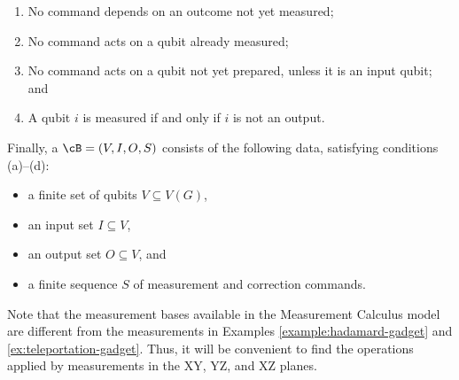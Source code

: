 \begin{definition}
\begin{enumerate}[label=(\alph*)]
    \item No command depends on an outcome not yet measured;
    \item No command acts on a qubit already measured;
    \item No command acts on a qubit not yet prepared, unless it is an input qubit; and
    \item A qubit $i$ is measured if and only if $i$ is not an output.
\end{enumerate}
Finally, a  $\cB=(V,I,O,S)$ consists of the following data, satisfying conditions (a)--(d):
\begin{itemize}
    \item a finite set of qubits $V \subseteq V(G)$,
    \item an input set $I \subseteq V$,
    \item an output set $O \subseteq V$, and
    \item a finite sequence $S$ of measurement and correction commands.
\end{itemize}
\end{definition}

Note that the measurement bases available in the Measurement Calculus model are different from the measurements in Examples \ref{example:hadamard-gadget} and \ref{ex:teleportation-gadget}. Thus, it will be convenient to find the operations applied by measurements in the XY, YZ, and XZ planes.

